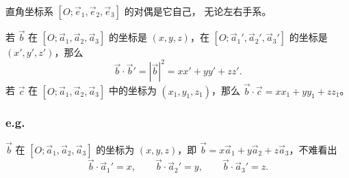 \documentclass[UTF8,11pt]{ctexart}
\theoremstyle{cnthm}
\begin{document}
直角坐标系 $[O;\vec e_1,\vec e_2,\vec e_3]$ 的对偶是它自己，
无论左右手系。

若 $\vec b$ 在 $[O;\vec a_1,\vec a_2,\vec a_3]$ 的坐标是
$(x,y,z)$，在 $[O;\vec a_1',\vec a_2',\vec a_3']$ 的坐标是
$(x',y',z')$，那么
\[
\vec b\cdot\vec b'=|\vec b|^2=xx'+yy'+zz' .
\]
若 $\vec c$ 在 $[O;\vec a_1,\vec a_2,\vec a_3]$ 中的坐标为
$(x_1,y_1,z_1)$，那么
$\vec b\cdot\vec c=xx_1+yy_1+zz_1$。

\subsubsection*{e.g.}

$\vec b$ 在 $[O;\vec a_1,\vec a_2,\vec a_3]$ 的坐标为
$(x,y,z)$，即
$\vec b=x\vec a_1+y\vec a_2+z\vec a_3$，不难看出
\[
\vec b\cdot\vec a_1'=x,\qquad
\vec b\cdot\vec a_2'=y,\qquad
\vec b\cdot\vec a_3'=z .
\]
\end{document}
